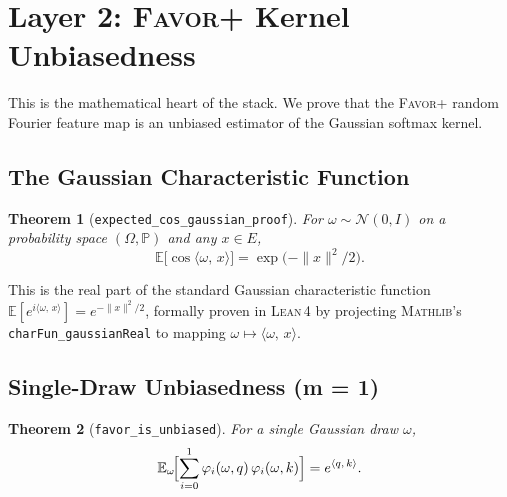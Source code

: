 \documentclass[11pt,a4paper,twocolumn]{article}
\newtheorem{theorem}{Theorem}[section]
\theoremstyle{definition}
\theoremstyle{remark}
\newcommand{\E}{\mathbb{E}}
\newcommand{\Prob}{\mathbb{P}}
\newcommand{\favor}{\textsc{Favor+}}
\newcommand{\lean}{\textsc{Lean\,4}}
\newcommand{\mathlib}{\textsc{Mathlib}}
\newcommand{\ip}[2]{\langle #1,\, #2 \rangle}
\newcommand{\leancode}[1]{\texttt{\color{leanblue}#1}}
\begin{document}
\section{Layer 2: \favor{} Kernel Unbiasedness}
\label{sec:layer2}

This is the mathematical heart of the stack. We prove that the \favor{}
random Fourier feature map is an unbiased estimator of the Gaussian softmax
kernel.

\subsection{The Gaussian Characteristic Function}

\begin{theorem}[\leancode{expected\_cos\_gaussian\_proof}]
\label{thm:gaussian}
For $\omega \sim \mathcal{N}(0, I)$ on a probability space $(\Omega, \Prob)$
and any $x \in E$,
\begin{equation}
  \E\!\bigl[\cos\ip{\omega}{x}\bigr]
  = \exp\!\bigl(-\|x\|^2 / 2\bigr).
  \label{eq:charfun}
\end{equation}
\end{theorem}

This is the real part of the standard Gaussian characteristic function
$\E[e^{i\ip{\omega}{x}}] = e^{-\|x\|^2/2}$, formally proven in \lean{} by 
projecting \mathlib{}'s \leancode{charFun\_gaussianReal} to mapping $\omega \mapsto \ip{\omega}{x}$.

\subsection{Single-Draw Unbiasedness (m = 1)}

\begin{theorem}[\leancode{favor\_is\_unbiased}]
\label{thm:m1}
For a single Gaussian draw $\omega$,
\begin{equation}
  \E_\omega\!\Bigl[\sum_{i=0}^{1}
    \varphi_i(\omega, q)\,\varphi_i(\omega, k)\Bigr]
  = e^{\ip{q}{k}}.
\end{equation}
\end{theorem}
\end{document}
